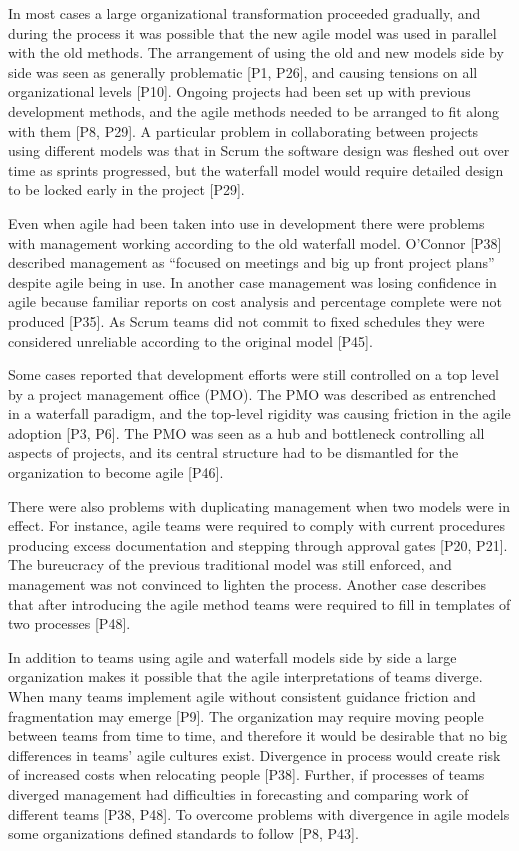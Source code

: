 \documentclass[preprint,authoryear,12pt]{elsarticle}
\begin{document}

In most cases a large organizational transformation proceeded gradually, and
during the process it was possible that the new agile model was used in parallel
with the old methods. The arrangement of using the old and new models side by
side was seen as generally problematic [P1, P26], and causing tensions on all
organizational levels [P10]. Ongoing projects had been set up with previous
development methods, and the agile methods needed to be arranged to fit along
with them [P8, P29]. A particular problem in collaborating between projects
using different models was that in Scrum the software design was fleshed out
over time as sprints progressed, but the waterfall model would require detailed
design to be locked early in the project [P29].

Even when agile had been taken into use in development there were problems with
management working according to the old waterfall model. O'Connor [P38]
described management as ``focused on meetings and big up front project plans''
despite agile being in use. In another case management was losing confidence in
agile because familiar reports on cost analysis and percentage complete were not
produced [P35]. As Scrum teams did not commit to fixed schedules they were
considered unreliable according to the original model [P45].

Some cases reported that development efforts were still controlled on a top
level by a project management office (PMO). The PMO was described as entrenched
in a waterfall paradigm, and the top-level rigidity was causing friction in the
agile adoption [P3, P6]. The PMO was seen as a hub and bottleneck controlling
all aspects of projects, and its central structure had to be dismantled for the
organization to become agile [P46].

There were also problems with duplicating management when two models were in
effect. For instance, agile teams were required to comply with current
procedures producing excess documentation and stepping through approval gates
[P20, P21]. The bureucracy of the previous traditional model was still enforced,
and management was not convinced to lighten the process. Another case describes
that after introducing the agile method teams were required to fill in templates
of two processes [P48].


In addition to teams using agile and waterfall models side by side a large
organization makes it possible that the agile interpretations of teams diverge.
When many teams implement agile without consistent guidance friction and
fragmentation may emerge [P9]. The organization may require moving people
between teams from time to time, and therefore it would be desirable that no big
differences in teams' agile cultures exist. Divergence in process would create
risk of increased costs when relocating people [P38].
Further, if processes of teams diverged management had difficulties in
forecasting and comparing work of different teams [P38, P48]. To overcome
problems with divergence in agile models some organizations defined standards to
follow [P8, P43].
\end{document}
